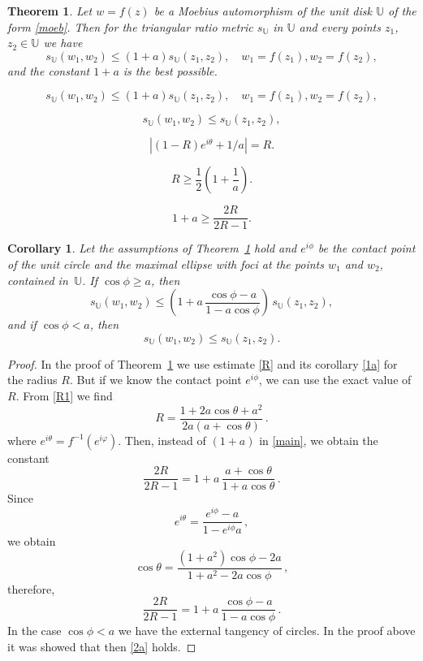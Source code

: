 \documentclass[10pt,a4paper]{amsart}
\newtheorem{theorem}{Theorem}
\newtheorem{corollary}{Corollary}
\begin{document}
\begin{theorem}\label{th1}
Let $w=f(z)$ be a Moebius automorphism of the unit disk $\mathbb{U}$  of the form \eqref{moeb}. Then for the triangular ratio metric  $s_\mathbb{U}$ in $\mathbb{U}$ and every points $z_1$, $z_2\in \mathbb{U}$ we have
\begin{equation}\label{main}
s_\mathbb{U}(w_1,w_2)\le (1+a)s_\mathbb{U}(z_1,z_2), \quad w_1=f(z_1), w_2=f(z_2),
\end{equation}
and the constant $1+a$ is the best possible.
\end{theorem}

\begin{equation}
s_\mathbb{U}(w_1,w_2)\le (1+a)s_\mathbb{U}(z_1,z_2), \quad w_1=f(z_1), w_2=f(z_2),
\end{equation}

\begin{equation}\label{2a}
s_\mathbb{U}(w_1,w_2)\le s_\mathbb{U}(z_1,z_2),
\end{equation}

\begin{equation}\label{R1}
|(1-R)e^{i\theta}+1/a|=R.
\end{equation}

\begin{equation}\label{R}
R\ge \frac{1}{2}\left(1+\frac{1}{a}\right).
\end{equation}

\begin{equation}\label{1a}
1+a\ge\frac{2R}{2R-1}.
\end{equation}

\begin{corollary}\label{cor3}
Let the assumptions of Theorem~\ref{th1}  hold and $e^{i\phi}$ be the contact point  of the unit circle and the maximal ellipse with foci at the points $w_1$ and $w_2$, contained in~$\mathbb{U}$. If $\cos\phi\ge a$, then
$$
s_\mathbb{U}(w_1,w_2)\le \left(1+a\,\frac{\cos\phi-a}{1-a\cos\phi}\right)\,s_\mathbb{U}(z_1,z_2),
$$
and if $\cos\phi< a$, then
$$
s_\mathbb{U}(w_1,w_2)\le s_\mathbb{U}(z_1,z_2).
$$
\end{corollary}

\begin{proof}
In the proof of Theorem~\ref{th1} we use estimate \eqref{R} and its corollary \eqref{1a} for the radius $R$. But if we know the contact point $e^{i\phi}$, we can  use the exact value of $R$. From \eqref{R1} we find
$$
R=\frac{1+2a\cos\theta+a^2}{2a(a+\cos \theta) }\,.
$$
where $e^{i\theta}=f^{-1}(e^{i\varphi})$.
Then, instead of $(1+a)$ in \eqref{main}, we obtain the constant
$$
\frac{2R}{2R-1}=1+a\,\frac{a+\cos\theta}{1+a\cos \theta}\,.
$$
Since
$$
e^{i\theta}=\frac{e^{i\phi}-a}{1-e^{i\phi }a}\,,
$$
we obtain
$$
\cos\theta= \frac{(1+a^2)\cos\phi-2a}{1+a^2-2a\cos \phi}\,,
$$
therefore,
$$
\frac{2R}{2R-1}=1+a\,\frac{\cos\phi-a}{1-a\cos\phi}\,.
$$
In the case $\cos\phi< a$ we have the external tangency of circles. In the proof above it was showed that then \eqref{2a} holds.
\end{proof}
\end{document}
